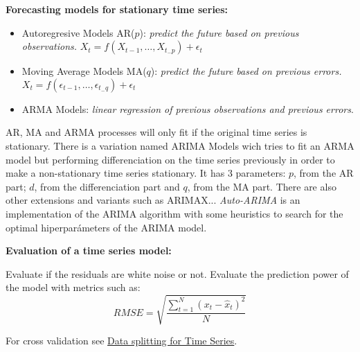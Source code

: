 \textbf{Forecasting models for stationary time series:}
\begin{itemize}
    \item Autoregresive Models AR($p$): \textit{predict the future based on previous observations.} $X_t = f(X_{t-1}, \dots, X_{t_-p}) + \epsilon_t$
    \item Moving Average Models MA($q$): \textit{predict the future based on previous errors.} $X_t = f(\epsilon_{t-1}, \dots, \epsilon_{t_-q}) + \epsilon_t$
    \item ARMA Models: \textit{linear regression of previous observations and previous errors}.
\end{itemize}
AR, MA and ARMA processes will only fit if the original time series is stationary. There is a variation named ARIMA Models wich tries to fit an ARMA model but performing differenciation on the time series previously in order to make a non-stationary time series stationary. It has 3 parameters: $p$, from the AR part; $d$, from the differenciation part and $q$, from the MA part. There are also other extensions and variants such as ARIMAX... \textit{Auto-ARIMA} is an implementation of the ARIMA algorithm with some heuristics to search for the optimal hiperparámeters of the ARIMA model.

\textbf{Evaluation of a time series model:}

Evaluate if the residuals are white noise or not. Evaluate the prediction power of the model with metrics such as:
$$
RMSE = \sqrt{\frac{\sum_{t=1}^{N}(x_t - \hat{x}_t)^2}{N}}
$$

For cross validation see \href{https://topepo.github.io/caret/data-splitting.html}{Data splitting for Time Series}.

